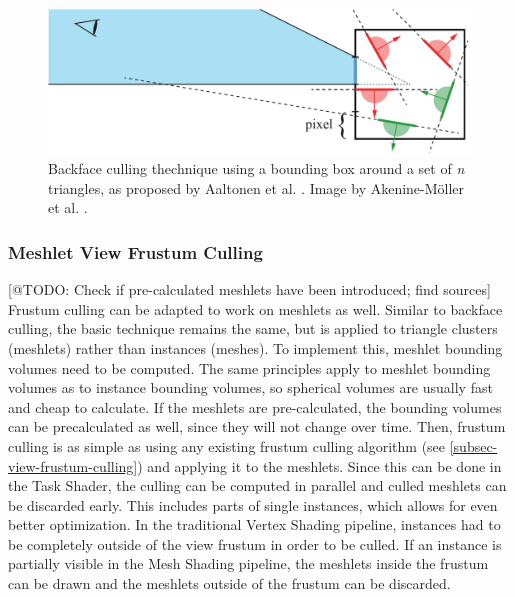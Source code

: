 \begin{figure}[h]
    \centering
    \includegraphics[width=\linewidth]{images/graphics/backface-culling-ac-unity.jpg}
    \caption{Backface culling thechnique using a bounding box around a set of \emph{n} triangles, 
    as proposed by Aaltonen et al. \cite{Aaltonen2015}. Image by Akenine-Möller et al. \cite{AkenineMoeller2018}.}
    \label{fig:backface-culling-ac-unity}
\end{figure}


\subsubsection*{Meshlet View Frustum Culling} \label{subsubsec-meshlet-view-frustum-culling}

[@TODO: Check if pre-calculated meshlets have been introduced; find sources]
Frustum culling can be adapted to work on meshlets as well. Similar to backface culling, the basic technique remains 
the same, but is applied to triangle clusters (meshlets) rather than instances (meshes). To implement this, meshlet 
bounding volumes need to be computed. The same principles apply to meshlet bounding volumes as to instance bounding 
volumes, so spherical volumes are usually fast and cheap to calculate. If the meshlets are pre-calculated, the 
bounding volumes can be precalculated as well, since they will not change over time. Then, frustum culling is as simple 
as using any existing frustum culling algorithm (see \ref{subsec-view-frustum-culling}) and applying it to the meshlets.
Since this can be done in the Task Shader, the culling can be computed in parallel and culled meshlets can be discarded 
early. This includes parts of single instances, which allows for even better optimization. In the traditional Vertex 
Shading pipeline, instances had to be completely outside of the view frustum in order to be culled. If an instance is 
partially visible in the Mesh Shading pipeline, the meshlets inside the frustum can be drawn and the meshlets outside 
of the frustum can be discarded. \\

